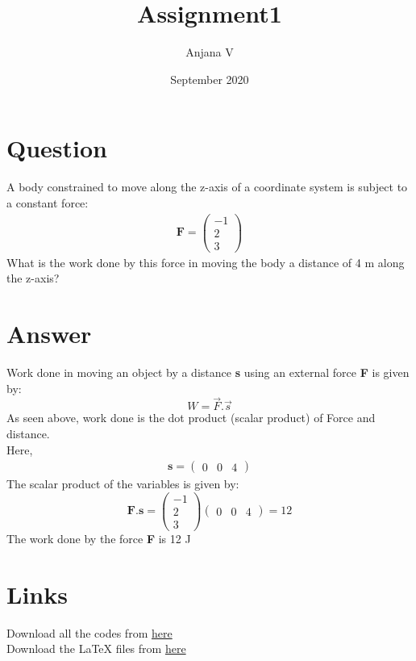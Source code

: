 \documentclass{article}
\title{Assignment1}
\author{Anjana V }
\date{September 2020}
\begin{document}
\maketitle
\section*{Question}
A body constrained to move along the z-axis of a coordinate system is subject to a constant force:
\begin{align*}
\textbf{F}=\begin{pmatrix}
-1\\
2\\
3
\end{pmatrix}    
\end{align*}
What is the work done by this force in moving the body a distance of 4 m along the z-axis?
\section*{Answer}
Work done in moving an object by a distance \textbf{s} using an external force \textbf{F} is given by:
$$W=\vec{F} . \vec{s}$$
As seen above, work done is the dot product (scalar product) of Force and distance.
\\Here, 
\begin{align*}
\textbf{s}=\begin{pmatrix}
0 & 0 & 4
\end{pmatrix}    
\end{align*}
The scalar product of the variables is given by:
$$\textbf{F}.\textbf{s} = \begin{pmatrix}
-1\\
2\\
3
\end{pmatrix}\begin{pmatrix}
0 & 0 & 4
\end{pmatrix}=12$$
The work done by the force \textbf{F} is 12 J
\section*{Links}
Download all the codes from \href{https://github.com/anjanavasudevan/grad_schoolwork/blob/master/EE5609/Assignment1/assignment.py}{here} 
\\Download the LaTeX files from \href{}{here}
\end{document}

